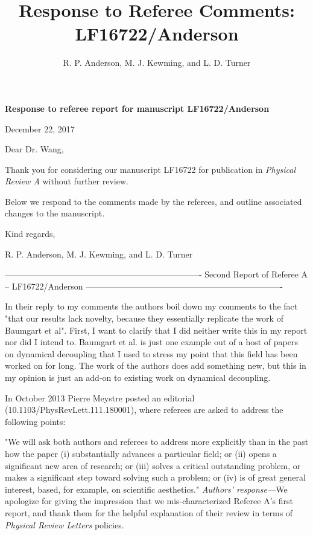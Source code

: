 \documentclass[letterpaper]{article}
\title{Response to Referee Comments: LF16722/Anderson}
\author{R. P. Anderson, M. J. Kewming, and L. D. Turner}
\newenvironment{refcomment}{\singlespacing\verbatim}{\endverbatim}
\newcommand{\response}{\emph{Authors' response---}}
\begin{document}

\textbf{Response to referee report for manuscript LF16722/Anderson}

December 22, 2017

Dear Dr. Wang,

Thank you for considering our manuscript LF16722 for publication in \textit{Physical Review A} without further review.

Below we respond to the comments made by the referees, and outline associated changes to the manuscript. 

Kind regards,

R. P. Anderson, M. J. Kewming, and L. D. Turner

\newpage
\begin{refcomment}
----------------------------------------------------------------------
Second Report of Referee A -- LF16722/Anderson
----------------------------------------------------------------------

In their reply to my comments the authors boil down my comments to the
fact "that our results lack novelty, because they
essentially replicate the work of Baumgart et al".
First, I want to clarify that I did neither write this in my report
nor did I intend to. Baumgart et al. is just one example out of a host
of papers on dynamical decoupling that I used to stress my point that
this field has been worked on for long. The work of the authors does
add something new, but this in my opinion is just an add-on to
existing work on dynamical decoupling.

In October 2013 Pierre Meystre posted an editorial
(10.1103/PhysRevLett.111.180001), where referees are asked to address
the following points:

"We will ask both authors and referees to address more explicitly than
in the past how the paper (i) substantially advances a particular
field; or (ii) opens a significant new area of research; or (iii)
solves a critical outstanding problem, or makes a significant step
toward solving such a problem; or (iv) is of great general interest,
based, for example, on scientific aesthetics."
\end{refcomment}
\response We apologize for giving the impression that we mis-characterized Referee A's first report, and thank them for the helpful explanation of their review in terms of \textit{Physical Review Letters} policies.
\end{document}
